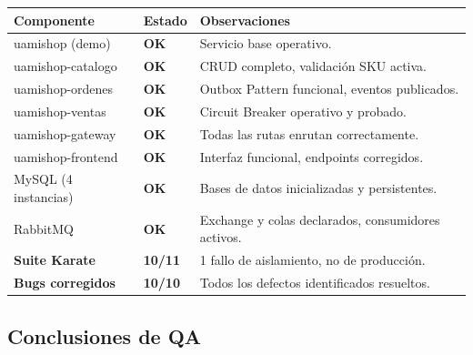 \documentclass[12pt,a4paper]{article}
\newcommand{\ok}{\textcolor{passgreen}{\bfseries OK}}
\begin{document}
\begin{center}
\begin{tabular}{@{}lll@{}}
  \toprule
  \textbf{Componente} & \textbf{Estado} & \textbf{Observaciones} \\
  \midrule
  uamishop (demo)           & \ok & Servicio base operativo. \\
  uamishop-catalogo         & \ok & CRUD completo, validaci\'on SKU activa. \\
  uamishop-ordenes          & \ok & Outbox Pattern funcional, eventos publicados. \\
  uamishop-ventas           & \ok & Circuit Breaker operativo y probado. \\
  uamishop-gateway          & \ok & Todas las rutas enrutan correctamente. \\
  uamishop-frontend         & \ok & Interfaz funcional, endpoints corregidos. \\
  MySQL (4 instancias)      & \ok & Bases de datos inicializadas y persistentes. \\
  RabbitMQ                  & \ok & Exchange y colas declarados, consumidores activos. \\
  \midrule
  \textbf{Suite Karate}     & \textbf{10/11} & 1 fallo de aislamiento, no de producci\'on. \\
  \textbf{Bugs corregidos}  & \textbf{10/10} & Todos los defectos identificados resueltos. \\
  \bottomrule
\end{tabular}
\end{center}

\subsection{Conclusiones de QA}
\end{document}
